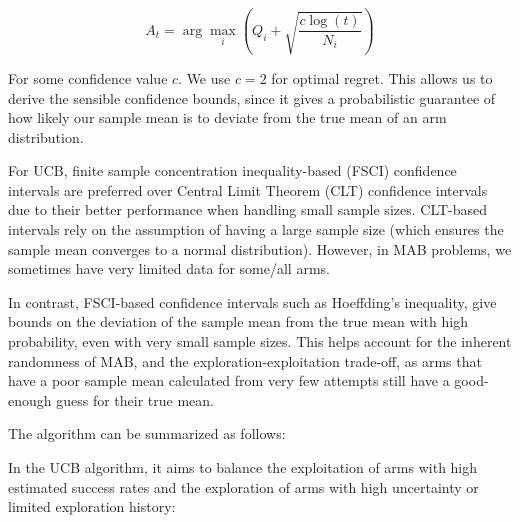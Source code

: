 $$
A_t = \arg\max_i \left( Q_i +  \sqrt{\frac{c\log(t)}{N_i}} \right)
$$

For some confidence value $c$. We use $c = 2$ for optimal regret. This allows us to derive the sensible confidence bounds, since it gives a probabilistic guarantee of how likely our sample mean is to deviate from the true mean of an arm distribution.

For UCB, finite sample concentration inequality-based (FSCI) confidence intervals are preferred over Central Limit Theorem (CLT) confidence intervals due to their better performance when handling small sample sizes. CLT-based intervals rely on the assumption of having a large sample size (which ensures the sample mean converges to a normal distribution). However, in MAB problems, we sometimes have very limited data for some/all arms.

In contrast, FSCI-based confidence intervals such as Hoeffding's inequality, give bounds on the deviation of the sample mean from the true mean with high probability, even with very small sample sizes. This helps account for the inherent randomness of MAB, and the exploration-exploitation trade-off, as arms that have a poor sample mean calculated from very few attempts still have a good-enough guess for their true mean.

The algorithm can be summarized as follows:


In the UCB algorithm, it aims to balance the exploitation of arms with high estimated success rates and the exploration of arms with high uncertainty or limited exploration history:


